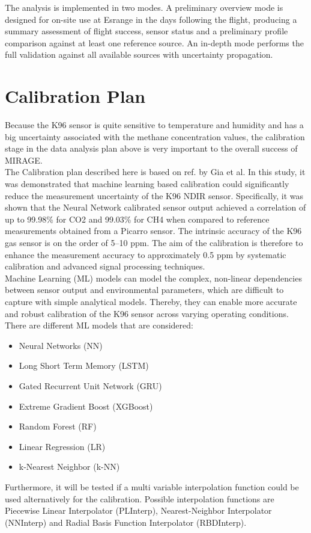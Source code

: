 The analysis is implemented in two modes. A preliminary overview mode is designed for on-site use at Esrange in the days following the flight, producing a summary assessment of flight success, sensor status and a preliminary profile comparison against at least one reference source. An in-depth mode performs the full validation against all available sources with uncertainty propagation.

\section{Calibration Plan}
Because the K96 sensor is quite sensitive to temperature and humidity and has a big uncertainty associated with the methane concentration values, the calibration stage in the data analysis plan above is very important to the overall success of MIRAGE. \\
The Calibration plan described here is based on ref. \cite{gia_accurate_2025} by Gia et al. In this study, it was demonstrated that machine learning based calibration could significantly reduce the measurement uncertainty of the K96 NDIR sensor. Specifically, it was shown that the Neural Network calibrated sensor output achieved a correlation of up to 99.98\% for CO2 and 99.03\% for CH4 when compared to reference measurements obtained from a Picarro sensor. The intrinsic accuracy of the K96 gas sensor is on the order of 5--10 ppm. The aim of the calibration is therefore to enhance the measurement accuracy to approximately 0.5 ppm by systematic calibration and advanced signal processing techniques. \\
Machine Learning (ML) models can model the complex, non-linear dependencies between sensor output and environmental parameters, which are difficult to capture with simple analytical models. Thereby, they can enable more accurate and robust calibration of the K96 sensor across varying operating conditions. \\
There are different ML models that are considered:
\begin{itemize}
  \item Neural Networks (NN)
  \item Long Short Term Memory (LSTM) 
  \item Gated Recurrent Unit Network (GRU)
  \item Extreme Gradient Boost (XGBoost)
  \item Random Forest (RF)
  \item Linear Regression (LR)
  \item k-Nearest Neighbor (k-NN) 
\end{itemize} 
Furthermore, it will be tested if a multi variable interpolation function could be used alternatively for the calibration. Possible interpolation functions are Piecewise Linear Interpolator (PLInterp), Nearest-Neighbor Interpolator (NNInterp) and Radial Basis Function Interpolator (RBDInterp). 
